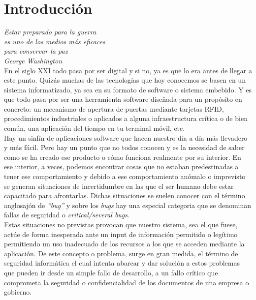 \chapter{Introducción}
\label{chap:introducción}

\emph{Estar preparado para la guerra\\ es uno de los medios más eficaces\\ para conservar la paz\\ George Washington}\\

En el siglo XXI todo pasa por ser digital y si no, ya es que lo era antes de llegar a este punto. Quizás muchas de las tecnologías que hoy conocemos se basen en un sistema informatizado, ya sea en su formato de software o sistema embebido. Y es que todo pasa por ser una herramienta software diseñada para un propósito en concreto: un mecanismo de apertura de puertas mediante tarjetas RFID, procedimientos industriales o aplicados a alguna infraestructura crítica o de bien común, una aplicación del tiempo en tu terminal móvil, etc. \\

Hay un sinfín de aplicaciones software que hacen nuestro día a día más llevadero y más fácil. Pero hay un punto que no todos conocen y es la necesidad de saber como se ha creado ese producto o cómo funciona realmente por su interior. En ese interior, a veces, podemos encontrar cosas que no estaban predestinadas a tener ese comportamiento y debido a ese comportamiento anómalo o imprevisto se generan situaciones de incertidumbre en las que el ser humano debe estar capacitado para afrontarlas. Dichas situaciones se suelen conocer con el término anglosajón de \emph{``bug''} y sobre los \emph{bugs} hay una especial categoria que se denominan fallas de seguridad o \emph{critical/several bugs}. \\

Estas situaciones no previstas provocan que nuestro sistema, sea el que fuese, actúe de forma inesperada ante un input de información permitido o legítimo permitiendo un uso inadecuado de los recursos a los que se acceden mediante la aplicación. De este concepto o problema, surge en gran medida, el término de seguridad informática el cual intenta abarcar y dar solución a estos problemas que pueden ir desde un simple fallo de desarrollo, a un fallo crítico que comprometa la seguridad o confidencialidad de los documentos de una empresa o gobierno. \\

